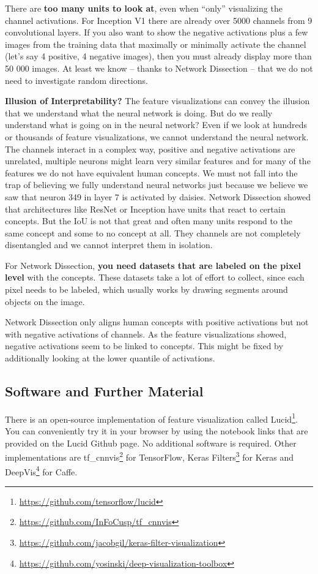 \documentclass[
  12pt,
]{krantz}
\renewcommand{\href}[2]{#2\footnote{\url{#1}}}
\begin{document}
There are \textbf{too many units to look at}, even when ``only'' visualizing the channel activations.
For Inception V1 there are already over 5000 channels from 9 convolutional layers.
If you also want to show the negative activations plus a few images from the training data that maximally or minimally activate the channel (let's say 4 positive, 4 negative images), then you must already display more than 50 000 images.
At least we know -- thanks to Network Dissection -- that we do not need to investigate random directions.

\textbf{Illusion of Interpretability?}
The feature visualizations can convey the illusion that we understand what the neural network is doing.
But do we really understand what is going on in the neural network?
Even if we look at hundreds or thousands of feature visualizations, we cannot understand the neural network.
The channels interact in a complex way, positive and negative activations are unrelated, multiple neurons might learn very similar features and for many of the features we do not have equivalent human concepts.
We must not fall into the trap of believing we fully understand neural networks just because we believe we saw that neuron 349 in layer 7 is activated by daisies.
Network Dissection showed that architectures like ResNet or Inception have units that react to certain concepts.
But the IoU is not that great and often many units respond to the same concept and some to no concept at all.
They channels are not completely disentangled and we cannot interpret them in isolation.

For Network Dissection, \textbf{you need datasets that are labeled on the pixel level} with the concepts.
These datasets take a lot of effort to collect, since each pixel needs to be labeled, which usually works by drawing segments around objects on the image.

Network Dissection only aligns human concepts with positive activations but not with negative activations of channels.
As the feature visualizations showed, negative activations seem to be linked to concepts.
This might be fixed by additionally looking at the lower quantile of activations.

\hypertarget{software-and-further-material}{%
\subsection{Software and Further Material}\label{software-and-further-material}}

There is an open-source implementation of feature visualization called \href{https://github.com/tensorflow/lucid}{Lucid}.
You can conveniently try it in your browser by using the notebook links that are provided on the Lucid Github page.
No additional software is required.
Other implementations are \href{https://github.com/InFoCusp/tf_cnnvis}{tf\_cnnvis} for TensorFlow, \href{https://github.com/jacobgil/keras-filter-visualization}{Keras Filters} for Keras and \href{https://github.com/yosinski/deep-visualization-toolbox}{DeepVis} for Caffe.
\end{document}
